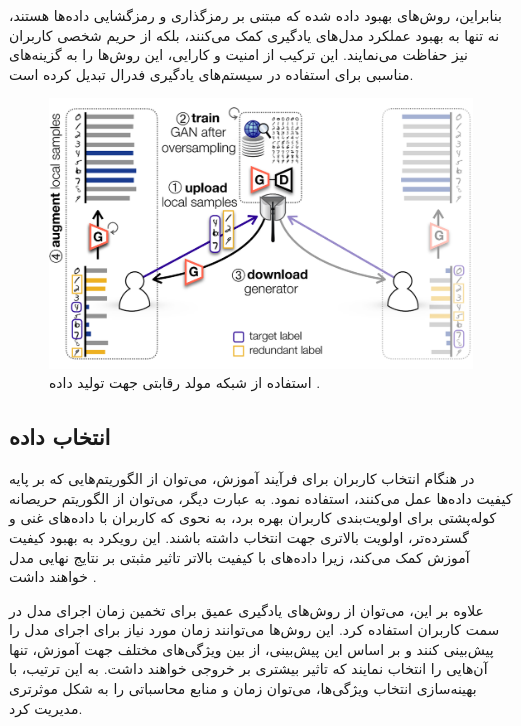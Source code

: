 بنابراین، روش‌های بهبود داده شده که مبتنی بر رمزگذاری و رمزگشایی داده‌ها هستند، نه تنها به بهبود عملکرد مدل‌های یادگیری کمک می‌کنند، بلکه از حریم شخصی کاربران نیز حفاظت می‌نمایند. این ترکیب از امنیت و کارایی، این روش‌ها را به گزینه‌های مناسبی برای استفاده در سیستم‌های یادگیری فدرال تبدیل کرده است.

\begin{figure}[t]
	\centering
	\includegraphics[scale=0.9]{images/chap3/generative_adversarial_network.png}%
	\caption{%
		استفاده از شبکه مولد رقابتی جهت تولید داده
		\cite{jeong2018communication}%
		.
	}
	\label{gan}
	\centering
\end{figure}

\subsection{انتخاب داده}
در هنگام انتخاب کاربران برای فرآیند آموزش، می‌توان از الگوریتم‌هایی که بر پایه کیفیت داده‌ها عمل می‌کنند، استفاده نمود. به عبارت دیگر، می‌توان از الگوریتم حریصانه کوله‌پشتی برای اولویت‌بندی کاربران بهره برد، به نحوی که کاربران با داده‌های غنی و گسترده‌تر، اولویت بالاتری جهت انتخاب داشته باشند. این رویکرد به بهبود کیفیت آموزش کمک می‌کند، زیرا داده‌های با کیفیت بالاتر تاثیر مثبتی بر نتایج نهایی مدل خواهند داشت
\cite{taik2021data}.

علاوه بر این، می‌توان از روش‌های یادگیری عمیق برای تخمین زمان اجرای مدل در سمت کاربران استفاده کرد. این روش‌ها می‌توانند زمان مورد نیاز برای اجرای مدل را پیش‌بینی کنند و بر اساس این پیش‌بینی، از بین ویژگی‌های مختلف جهت آموزش، تنها آن‌هایی را انتخاب نمایند که تاثیر بیشتری بر خروجی خواهند داشت. به این ترتیب، با بهینه‌سازی انتخاب ویژگی‌ها، می‌توان زمان و منابع محاسباتی را به شکل موثرتری مدیریت کرد.

